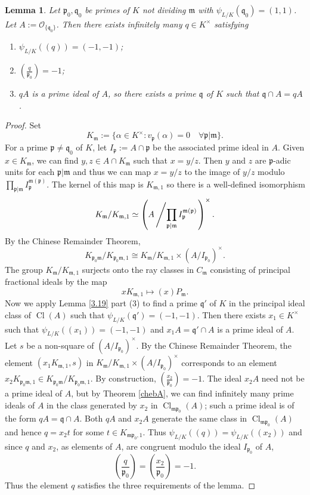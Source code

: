 \documentclass[12pt,reqno]{amsart}
\newcommand{\qq}{\mathfrak{q}}
\newcommand{\mm}{\mathfrak{m}}
\newcommand{\OO}{\mathcal{O}}
\newcommand{\pp}{\mathfrak{p}}
\DeclareMathOperator{\Cl}{Cl}
\newtheorem{lem}[thm]{Lemma}
\theoremstyle{definition}
\begin{document}
\begin{lem}\label{Aprime}
Let $\pp_0,\qq_0$ be primes of $K$ not dividing $\mm$ with $\psi_{L/K}(\qq_0)=(1,1)$. Let $A:=\OO_{\{\qq_0\}}$. Then there exists infinitely many $q\in K^{\times}$ satisfying
\begin{enumerate}
\item $\psi_{L/K}((q))=(-1,-1)$;
\item $\left(\frac{q}{\pp_0}\right) = -1$;
\item $qA$ is a prime ideal of $A$, so there exists a prime $\qq$ of $K$ such that $\qq\cap A = qA$. 
\end{enumerate}
\end{lem}

\begin{proof}
  Set
  \[
  K_{\mm}:=\{ \alpha\in K^{\times}: v_{\pp}(\alpha)=0\quad \forall \pp
  | \mm\}.
  \]
  For a prime $\pp\not=\qq_0$ of $K$, let $I_{\pp}:=A\cap\pp$ be the
  associated prime ideal in $A$. Given $x\in K_{\mm}$, we can find $y,z\in A\cap K_{\mm}$ such that $x=y/z$. Then $y$ and $z$ are $\pp$-adic units for each $\pp|\mm$ and thus we can map $x=y/z$ to the image of $y/z$ modulo $\prod_{\pp|\mm}I_{\pp}^{\mm(\pp)}$. The kernel of this map is $K_{\mm,1}$ so there is a well-defined isomorphism
\[
K_{\mm}/ K_{\mm,1} \simeq \left(A\left/\prod_{\pp|\mm}I_{\pp}^{\mm(\pp)}\right.\right)^{\times}.
\]
By the Chinese Remainder Theorem,
\[
K_{\pp_0\mm}/K_{\pp_0\mm,1}\cong K_{\mm}/K_{\mm,1}\times (A/I_{\pp_0})^{\times}. 
\]
The group $K_{\mm}/K_{\mm,1}$ surjects onto the ray classes in $C_{\mm}$ consisting of principal fractional ideals by the map 
\[
xK_{\mm,1} \mapsto (x)P_{\mm}.
\]
Now we apply Lemma \ref{3.19} part (3) to find a prime $\qq'$ of
$K$ in the principal ideal class of $\Cl(A)$ such that
$\psi_{L/K}(\qq')=(-1,-1)$. Then there exists $x_1\in K^{\times}$ such that
$\psi_{L/K}((x_1))=(-1,-1)$ and $x_1A=\qq'\cap A$ is a prime ideal of $A$. Let $s$ be a non-square of
$(A/I_{\pp_0})^{\times}$. By the Chinese Remainder Theorem, the element $(x_1K_{\mm,1},s)$ in $K_{\mm}/K_{\mm,1}\times (A/I_{\pp_0})^{\times}$ corresponds to an element
$x_2K_{\pp_0\mm,1}\in K_{\pp_0\mm}/K_{\pp_0\mm,1}$. By construction, $\left(\frac{x_2}{\pp_0}\right)=-1$. The ideal $x_2A$ need not be a prime ideal of $A$, but  by Theorem \ref{chebA}, we can find infinitely many
prime ideals of $A$ in the class generated by $x_2$ in $\Cl_{\mm\pp_0}(A)$; such a prime ideal is of the form $qA=\qq\cap A$. Both $qA$ and $x_2A$ generate the same class in $\Cl_{\mm\pp_0}(A)$ and hence $q=x_2t$ for some $t\in K_{\mm\pp_0,1}$. Thus $\psi_{L/K}((q))=\psi_{L/K}((x_2))$ and since $q$ and $x_2$, as elements of $A$, are congruent modulo the ideal $I_{\pp_0}$ of $A$,
\[
\left(\frac{q}{\pp_0}\right)=\left(\frac{x_2}{\pp_0}\right)=-1.
\]
 Thus the element $q$ satisfies the three requirements of the lemma.

\end{proof}
\end{document}
